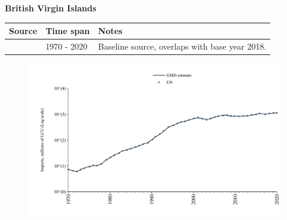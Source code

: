 \documentclass[12pt,a4paper,landscape]{article}
\begin{document}
\begin{adjustbox}{max totalsize={\paperwidth}{\paperheight},center}
\begin{minipage}[t][\textheight][t]{\textwidth}
\vspace*{0.5cm}
{}
\begin{center}
{\Large\bfseries British Virgin Islands}
\end{center}
\vspace{0.5cm}
\begin{table}[H]
\centering
\small
\begin{tabular}{|l|l|l|}
\hline
\textbf{Source} & \textbf{Time span} & \textbf{Notes} \\
\hline
\rowcolor{white}\cite{UN}& 1970 - 2020 &Baseline source, overlaps with base year 2018.\\
\hline
\end{tabular}
\end{table}
\begin{figure}[H]
\centering
\includegraphics[width=\textwidth,height=0.6\textheight,keepaspectratio]{graphs/VGB_imports.pdf}
\end{figure}
\end{minipage}
\end{adjustbox}
\end{document}
